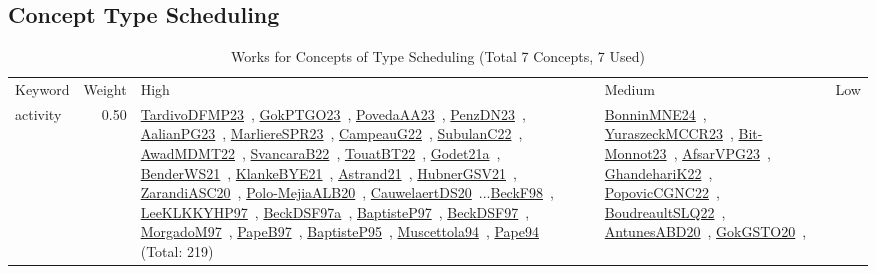 \clearpage
\subsection{Concept Type Scheduling}
\label{sec:Scheduling}
\label{Scheduling}
{\scriptsize
\begin{longtable}{p{3cm}r>{\raggedright\arraybackslash}p{6cm}>{\raggedright\arraybackslash}p{6cm}>{\raggedright\arraybackslash}p{8cm}}
\rowcolor{white}\caption{Works for Concepts of Type Scheduling (Total 7 Concepts, 7 Used)}\\ \toprule
\rowcolor{white}Keyword & Weight & High & Medium & Low\\ \midrule\endhead
\bottomrule
\endfoot
\index{activity}\index{Scheduling!activity}activity &  0.50 & \href{../works/TardivoDFMP23.pdf}{TardivoDFMP23}~\cite{TardivoDFMP23}, \href{../works/GokPTGO23.pdf}{GokPTGO23}~\cite{GokPTGO23}, \href{../works/PovedaAA23.pdf}{PovedaAA23}~\cite{PovedaAA23}, \href{../works/PenzDN23.pdf}{PenzDN23}~\cite{PenzDN23}, \href{../works/AalianPG23.pdf}{AalianPG23}~\cite{AalianPG23}, \href{../works/MarliereSPR23.pdf}{MarliereSPR23}~\cite{MarliereSPR23}, \href{../works/CampeauG22.pdf}{CampeauG22}~\cite{CampeauG22}, \href{../works/SubulanC22.pdf}{SubulanC22}~\cite{SubulanC22}, \href{../works/AwadMDMT22.pdf}{AwadMDMT22}~\cite{AwadMDMT22}, \href{../works/SvancaraB22.pdf}{SvancaraB22}~\cite{SvancaraB22}, \href{../works/TouatBT22.pdf}{TouatBT22}~\cite{TouatBT22}, \href{../works/Godet21a.pdf}{Godet21a}~\cite{Godet21a}, \href{../works/BenderWS21.pdf}{BenderWS21}~\cite{BenderWS21}, \href{../works/KlankeBYE21.pdf}{KlankeBYE21}~\cite{KlankeBYE21}, \href{../works/Astrand21.pdf}{Astrand21}~\cite{Astrand21}, \href{../works/HubnerGSV21.pdf}{HubnerGSV21}~\cite{HubnerGSV21}, \href{../works/ZarandiASC20.pdf}{ZarandiASC20}~\cite{ZarandiASC20}, \href{../works/Polo-MejiaALB20.pdf}{Polo-MejiaALB20}~\cite{Polo-MejiaALB20}, \href{../works/CauwelaertDS20.pdf}{CauwelaertDS20}~\cite{CauwelaertDS20}...\href{../works/BeckF98.pdf}{BeckF98}~\cite{BeckF98}, \href{../works/LeeKLKKYHP97.pdf}{LeeKLKKYHP97}~\cite{LeeKLKKYHP97}, \href{../works/BeckDSF97a.pdf}{BeckDSF97a}~\cite{BeckDSF97a}, \href{../works/BaptisteP97.pdf}{BaptisteP97}~\cite{BaptisteP97}, \href{../works/BeckDSF97.pdf}{BeckDSF97}~\cite{BeckDSF97}, \href{../works/MorgadoM97.pdf}{MorgadoM97}~\cite{MorgadoM97}, \href{../works/PapeB97.pdf}{PapeB97}~\cite{PapeB97}, \href{../works/BaptisteP95.pdf}{BaptisteP95}~\cite{BaptisteP95}, \href{../works/Muscettola94.pdf}{Muscettola94}~\cite{Muscettola94}, \href{../works/Pape94.pdf}{Pape94}~\cite{Pape94} (Total: 219) & \href{../works/BonninMNE24.pdf}{BonninMNE24}~\cite{BonninMNE24}, \href{../works/YuraszeckMCCR23.pdf}{YuraszeckMCCR23}~\cite{YuraszeckMCCR23}, \href{../works/Bit-Monnot23.pdf}{Bit-Monnot23}~\cite{Bit-Monnot23}, \href{../works/AfsarVPG23.pdf}{AfsarVPG23}~\cite{AfsarVPG23}, \href{../works/GhandehariK22.pdf}{GhandehariK22}~\cite{GhandehariK22}, \href{../works/PopovicCGNC22.pdf}{PopovicCGNC22}~\cite{PopovicCGNC22}, \href{../works/BoudreaultSLQ22.pdf}{BoudreaultSLQ22}~\cite{BoudreaultSLQ22}, \href{../works/AntunesABD20.pdf}{AntunesABD20}~\cite{AntunesABD20}, \href{../works/GokGSTO20.pdf}{GokGSTO20}~\cite{GokGSTO20}, 
\end{longtable}}
